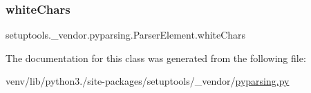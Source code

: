 \subsubsection{\texorpdfstring{white\+Chars}{whiteChars}}
{\footnotesize\ttfamily setuptools.\+\_\+vendor.\+pyparsing.\+Parser\+Element.\+white\+Chars}



The documentation for this class was generated from the following file\+:\begin{DoxyCompactItemize}
\item 
venv/lib/python3./site-\/packages/setuptools/\+\_\+vendor/\hyperlink{setuptools_2__vendor_2pyparsing_8py}{pyparsing.\+py}\end{DoxyCompactItemize}

